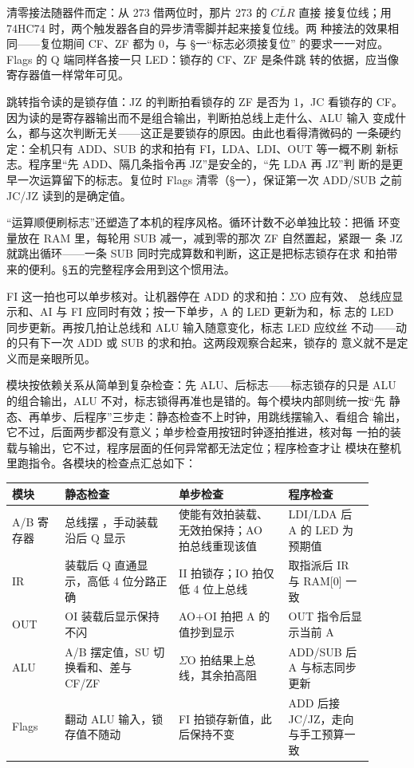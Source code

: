 清零接法随器件而定：从 273 借两位时，那片 273 的 $\overline{CLR}$ 直接
接复位线；用 74HC74 时，两个触发器各自的异步清零脚并起来接复位线。两
种接法的效果相同——复位期间 CF、ZF 都为 0，与 §一“标志必须接复位”
的要求一一对应。Flags 的 Q 端同样各接一只 LED：锁存的 CF、ZF 是条件跳
转的依据，应当像寄存器值一样常年可见。

跳转指令读的是锁存值：JZ 的判断拍看锁存的 ZF 是否为 1，JC 看锁存的
CF。因为读的是寄存器输出而不是组合输出，判断拍总线上走什么、ALU 输入
变成什么，都与这次判断无关——这正是要锁存的原因。由此也看得清微码的
一条硬约定：全机只有 ADD、SUB 的求和拍有 FI，LDA、LDI、OUT 等一概不刷
新标志。程序里“先 ADD、隔几条指令再 JZ”是安全的，“先 LDA 再 JZ”判
断的是更早一次运算留下的标志。复位时 Flags 清零（§一），保证第一次
ADD/SUB 之前 JC/JZ 读到的是确定值。

“运算顺便刷标志”还塑造了本机的程序风格。循环计数不必单独比较：把循
环变量放在 RAM 里，每轮用 SUB 减一，减到零的那次 ZF 自然置起，紧跟一
条 JZ 就跳出循环——一条 SUB 同时完成算数和判断，这正是把标志锁存在求
和拍带来的便利。§五的完整程序会用到这个惯用法。

FI 这一拍也可以单步核对。让机器停在 ADD 的求和拍：$\Sigma$O 应有效、
总线应显示和、AI 与 FI 应同时有效；按一下单步，A 的 LED 更新为和，标
志的 LED 同步更新。再按几拍让总线和 ALU 输入随意变化，标志 LED 应纹丝
不动——动的只有下一次 ADD 或 SUB 的求和拍。这两段观察合起来，锁存的
意义就不是定义而是亲眼所见。

模块按依赖关系从简单到复杂检查：先 ALU、后标志——标志锁存的只是 ALU
的组合输出，ALU 不对，标志锁得再准也是错的。每个模块内部则统一按“先
静态、再单步、后程序”三步走：静态检查不上时钟，用跳线摆输入、看组合
输出，它不过，后面两步都没有意义；单步检查用按钮时钟逐拍推进，核对每
一拍的装载与输出，它不过，程序层面的任何异常都无法定位；程序检查才让
模块在整机里跑指令。各模块的检查点汇总如下：

\begin{longtable}{L{0.13\linewidth}L{0.29\linewidth}L{0.27\linewidth}L{0.21\linewidth}}
\toprule
模块 & 静态检查 & 单步检查 & 程序检查 \\
\midrule
A/B 寄存器 & 总线摆 ，手动装载沿后 Q 显示  & 使能有效拍装载、无效拍保持；AO 拍总线重现该值 & LDI/LDA 后 A 的 LED 为预期值 \\
IR & 装载后 Q 直通显示，高低 4 位分路正确 & II 拍锁存；IO 拍仅低 4 位上总线 & 取指派后 IR 与 RAM[0] 一致 \\
OUT & OI 装载后显示保持不闪 & AO+OI 拍把 A 的值抄到显示 & OUT 指令后显示当前 A \\
ALU & A/B 摆定值，SU 切换看和、差与 CF/ZF & $\Sigma$O 拍结果上总线，其余拍高阻 & ADD/SUB 后 A 与标志同步更新 \\
Flags & 翻动 ALU 输入，锁存值不随动 & FI 拍锁存新值，此后保持不变 & ADD 后接 JC/JZ，走向与手工预算一致 \\
\bottomrule
\end{longtable}

